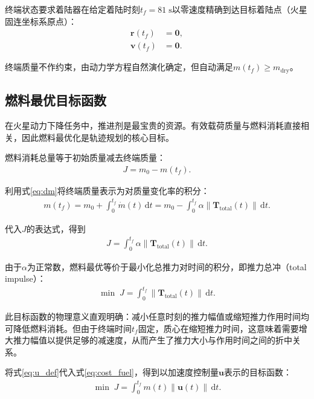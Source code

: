 终端状态要求着陆器在给定着陆时刻$t_f = 81\;\mathrm{s}$以零速度精确到达目标着陆点（火星固连坐标系原点）：
\begin{align}
    \bm{r}(t_f) &= \bm{0}, \\
    \bm{v}(t_f) &= \bm{0}. \label{eq:term_cond}
\end{align}

终端质量不作约束，由动力学方程自然演化确定，但自动满足$m(t_f) \geq m_{\mathrm{dry}}$。

\subsection{燃料最优目标函数}

在火星动力下降任务中，推进剂是最宝贵的资源。有效载荷质量与燃料消耗直接相关，因此燃料最优化是轨迹规划的核心目标。

燃料消耗总量等于初始质量减去终端质量：
\begin{align}
    J = m_0 - m(t_f).
\end{align}

利用式\eqref{eq:dm}将终端质量表示为对质量变化率的积分：
\begin{align}
    m(t_f) = m_0 + \int_0^{t_f} \dot{m}(t)\,\mathrm{d}t
           = m_0 - \int_0^{t_f} \alpha \left\|\bm{T}_{\mathrm{total}}(t)\right\|\,\mathrm{d}t.
\end{align}

代入$J$的表达式，得到
\begin{align}
    J = \int_0^{t_f} \alpha \left\|\bm{T}_{\mathrm{total}}(t)\right\|\,\mathrm{d}t. \label{eq:cost_full}
\end{align}

由于$\alpha$为正常数，燃料最优等价于最小化总推力对时间的积分，即推力总冲（total impulse）：
\begin{align}
    \min\; J = \int_0^{t_f} \left\|\bm{T}_{\mathrm{total}}(t)\right\|\,\mathrm{d}t. \label{eq:cost_fuel}
\end{align}

此目标函数的物理意义直观明确：减小任意时刻的推力幅值或缩短推力作用时间均可降低燃料消耗。但由于终端时间$t_f$固定，质心在缩短推力时间，这意味着需要增大推力幅值以提供足够的减速度，从而产生了推力大小与作用时间之间的折中关系。

将式\eqref{eq:u_def}代入式\eqref{eq:cost_fuel}，得到以加速度控制量$\bm{u}$表示的目标函数：
\begin{align}
    \min\; J = \int_0^{t_f} m(t)\left\|\bm{u}(t)\right\|\,\mathrm{d}t. \label{eq:cost_u}
\end{align}

